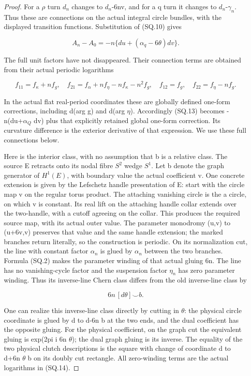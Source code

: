 \begin{proof}
For a \(\rho\) turn \(d_{n}\) changes to \(d_{n}\)-6nv, and for a q turn it changes
to \(d_{n}\)-\(\gamma_{n}\). Thus these are connections on the actual integral
circle bundles, with the displayed transition functions. Substitution
of (SQ.10) gives

\[
 A_n-A_0=-n\{du+(\alpha_q-6\theta)dv\}.             \tag{SQ.13}
\]

The full unit factors have not disappeared. Their connection terms
are obtained from their actual periodic logarithms

\[
 f_{11}=f_\kappa+nf_g,\quad
 f_{21}=f_\alpha+nf_\eta-nf_\kappa-n^2f_g,\quad
 f_{12}=f_g,\quad f_{22}=f_\eta-nf_g.                \tag{SQ.14}
\]

In the actual flat real-period coordinates these are globally defined
one-form corrections, including d(arg g) and d(arg \(\eta\)). Accordingly
(SQ.13) becomes -n(du+\(\alpha_{Q}\) dv) plus that explicitly retained
global one-form correction. Its curvature difference is the exterior
derivative of that expression. We use these full connections below.

Here is the interior class, with no assumption that b is a relative
class. The source E retracts onto its nodal fibre \(S^{2}\) wedge \(S^{1}\).
Let b denote the graph generator of \(H^{1}(E)\), with boundary value the
actual coefficient v. One concrete extension is given by the Lefschetz
handle presentation of E: start with the circle map v on the regular
torus product. The attaching vanishing circle is the a circle, on
which v is constant. Its real lift on the attaching handle collar
extends over the two-handle, with a cutoff agreeing on the collar.
This produces the required source map, with its actual outer value.
The parameter monodromy (u,v) to (u+6v,v) preserves that value and
the same handle extension; the marked branches return literally,
so the construction is periodic. On its normalization cut,
the line with constant factor \(\alpha_{n}\) is glued by \(\alpha_{n}\) between the
two branches. Formula (SQ.2) makes the parameter winding of that
actual gluing 6n. The line has no vanishing-cycle factor and the
suspension factor \(\eta_{n}\) has zero parameter winding. Thus its
inverse-line Chern class differs from the old inverse-line class by

\[
                         6n\,[d\theta]\smile b.         \tag{SQ.15}
\]

One can realize this inverse-line class directly by cutting in \(\theta\):
the physical circle coordinate is glued by d to d-6n b at the two ends,
and the dual coefficient has the opposite gluing. For the physical
coefficient, on the graph cut the equivalent gluing is
exp(2pi i 6n \(\theta\)); the dual graph gluing is its inverse. The equality
of the two physical clutch descriptions is the square with change of coordinate
d to d+6n \(\theta\) b on its doubly cut rectangle. All zero-winding
terms are the actual logarithms in (SQ.14).


\end{proof}
